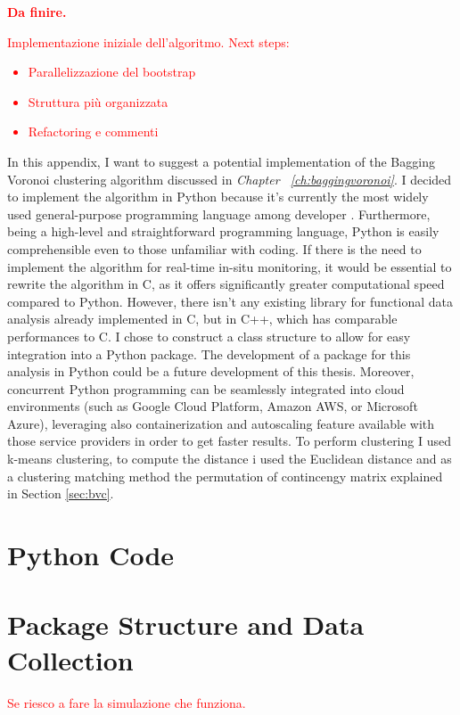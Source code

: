 \textbf{\textcolor{red}{Da finire.}}\\
\textcolor{red}{Implementazione iniziale dell'algoritmo. Next steps:
\begin{itemize}
    \item Parallelizzazione del bootstrap
    \item Struttura più organizzata
    \item Refactoring e commenti
\end{itemize}}
In this appendix, I want to suggest a potential implementation of the Bagging Voronoi clustering algorithm discussed in \emph{Chapter ~\ref{ch:baggingvoronoi}}. I decided to implement the algorithm in Python because it's currently the most widely used general-purpose programming language among developer \cite{lionel_sujay_vailshery_most_2023}. Furthermore, being a high-level and straightforward programming language, Python is easily comprehensible even to those unfamiliar with coding. If there is the need to implement the algorithm for real-time in-situ monitoring, it would be essential to rewrite the algorithm in C, as it offers significantly greater computational speed compared to Python. However, there isn't any existing library for functional data analysis already implemented in C, but in C++, which has comparable performances to C. I chose to construct a class structure to allow for easy integration into a Python package. The development of a package for this analysis in Python could be a future development of this thesis. Moreover, concurrent Python programming can be seamlessly integrated into cloud environments (such as Google Cloud Platform, Amazon AWS, or Microsoft Azure), leveraging also containerization and autoscaling feature available with those service providers in order to get faster results. To perform clustering I used k-means clustering, to compute the distance i used the Euclidean distance and as a clustering matching method the permutation of contincengy matrix explained in Section \ref{sec:bvc}.
\section{Python Code}
%

\section{Package Structure and Data Collection}
\textcolor{red}{Se riesco a fare la simulazione che funziona.}

